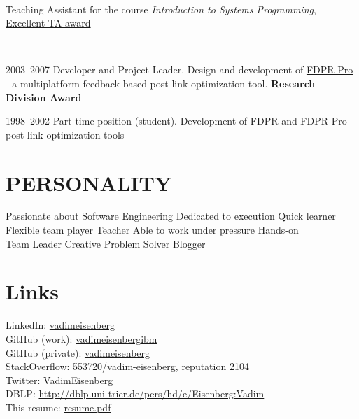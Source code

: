 \documentclass[]{deedy-resume}
\begin{document}
\begin{minipage}[t]{0.66\textwidth}
 \\
\vspace{\topsep} %
Teaching Assistant for the course \textit{Introduction to Systems Programming}, \href{http://www.cs.technion.ac.il/news/2010/384/}{Excellent TA award}
\sectionsep

 \\
\vspace{\topsep} %
\begin{tightemize}
\item 2003--2007 Developer and Project Leader. Design and development of \href{http://www.haifa.il.ibm.com/projects/systems/cot/fdpr/}{FDPR-Pro} - a multiplatform feedback-based post-link optimization tool. \textbf{Research Division Award}
\item  1998--2002 Part time position (student). Development of FDPR and FDPR-Pro post-link optimization tools
\end{tightemize}
\sectionsep


\section{PERSONALITY}
Passionate about Software Engineering \textbullet{} Dedicated to execution \textbullet{}  Quick learner\\
Flexible team player \textbullet{} Teacher \textbullet{}  Able to work under pressure \textbullet{} Hands-on \\
Team Leader \textbullet{} Creative Problem Solver \textbullet{} Blogger

\section{Links}
LinkedIn:  \href{https://www.linkedin.com/in/vadimeisenberg}{vadimeisenberg} \\
GitHub (work): \href{https://github.com/vadimeisenbergibm}{vadimeisenbergibm} \\
GitHub (private): \href{https://github.com/vadimeisenberg}{vadimeisenberg} \\
StackOverflow: \href{http://stackoverflow.com/users/553720/vadim-eisenberg}{553720/vadim-eisenberg}, reputation 2104 \\
Twitter: \href{https://twitter.com/VadimEisenberg}{VadimEisenberg} \\
DBLP: \href{http://dblp.uni-trier.de/pers/hd/e/Eisenberg:Vadim}{http://dblp.uni-trier.de/pers/hd/e/Eisenberg:Vadim} \\
This resume: \href{https://github.com/VadimEisenberg/resume/raw/gh-pages/resume.pdf}{resume.pdf}


\end{minipage}
\end{document}
